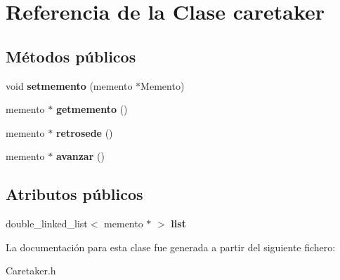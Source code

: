 \hypertarget{classcaretaker}{}\section{Referencia de la Clase caretaker}
\label{classcaretaker}
\subsection*{Métodos públicos}
\begin{DoxyCompactItemize}
\item 
\mbox{\label{classcaretaker_a0251f0e9f845fa596b9ce2f2beed3c71}} 
void {\bfseries setmemento} (memento $\ast$Memento)
\item 
\mbox{\label{classcaretaker_a1fb546ad9a4fb71eec138afb42b1a744}} 
memento $\ast$ {\bfseries getmemento} ()
\item 
\mbox{\label{classcaretaker_aa63a4f7e099ce820998d6c7c85ec8385}} 
memento $\ast$ {\bfseries retrosede} ()
\item 
\mbox{\label{classcaretaker_af558d2ec12cd9f95365704269ea46164}} 
memento $\ast$ {\bfseries avanzar} ()
\end{DoxyCompactItemize}
\subsection*{Atributos públicos}
\begin{DoxyCompactItemize}
\item 
\mbox{\label{classcaretaker_ab12d0794f90bc4ef7bdecfa11f40998c}} 
double\+\_\+linked\+\_\+list$<$ memento $\ast$ $>$ {\bfseries list}
\end{DoxyCompactItemize}


La documentación para esta clase fue generada a partir del siguiente fichero\+:\begin{DoxyCompactItemize}
\item 
Caretaker.\+h\end{DoxyCompactItemize}
